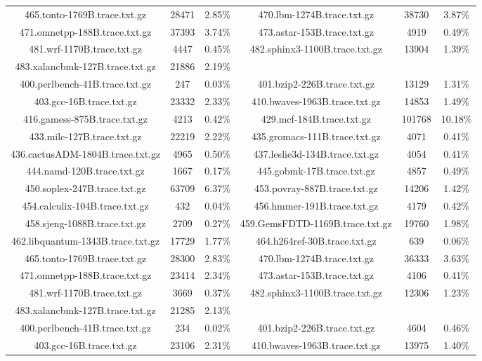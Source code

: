 \begin{table}[H]
\begin{tabular}{|c|c|c|c|c|c|}
465.tonto-1769B.trace.txt.gz & 28471 & 2.85\% & 470.lbm-1274B.trace.txt.gz & 38730 & 3.87\% \\
471.omnetpp-188B.trace.txt.gz & 37393 & 3.74\% & 473.astar-153B.trace.txt.gz & 4919 & 0.49\% \\
481.wrf-1170B.trace.txt.gz & 4447 & 0.45\% & 482.sphinx3-1100B.trace.txt.gz & 13904 & 1.39\% \\
483.xalancbmk-127B.trace.txt.gz & 21886 & 2.19\% & & & &  \\
400.perlbench-41B.trace.txt.gz & 247 & 0.03\% & 401.bzip2-226B.trace.txt.gz & 13129 & 1.31\% \\
403.gcc-16B.trace.txt.gz & 23332 & 2.33\% & 410.bwaves-1963B.trace.txt.gz & 14853 & 1.49\% \\
416.gamess-875B.trace.txt.gz & 4213 & 0.42\% & 429.mcf-184B.trace.txt.gz & 101768 & 10.18\% \\
433.milc-127B.trace.txt.gz & 22219 & 2.22\% & 435.gromacs-111B.trace.txt.gz & 4071 & 0.41\% \\
436.cactusADM-1804B.trace.txt.gz & 4965 & 0.50\% & 437.leslie3d-134B.trace.txt.gz & 4054 & 0.41\% \\
444.namd-120B.trace.txt.gz & 1667 & 0.17\% & 445.gobmk-17B.trace.txt.gz & 4857 & 0.49\% \\
450.soplex-247B.trace.txt.gz & 63709 & 6.37\% & 453.povray-887B.trace.txt.gz & 14206 & 1.42\% \\
454.calculix-104B.trace.txt.gz & 432 & 0.04\% & 456.hmmer-191B.trace.txt.gz & 4179 & 0.42\% \\
458.sjeng-1088B.trace.txt.gz & 2709 & 0.27\% & 459.GemsFDTD-1169B.trace.txt.gz & 19760 & 1.98\% \\
462.libquantum-1343B.trace.txt.gz & 17729 & 1.77\% & 464.h264ref-30B.trace.txt.gz & 639 & 0.06\% \\
465.tonto-1769B.trace.txt.gz & 28300 & 2.83\% & 470.lbm-1274B.trace.txt.gz & 36333 & 3.63\% \\
471.omnetpp-188B.trace.txt.gz & 23414 & 2.34\% & 473.astar-153B.trace.txt.gz & 4106 & 0.41\% \\
481.wrf-1170B.trace.txt.gz & 3669 & 0.37\% & 482.sphinx3-1100B.trace.txt.gz & 12306 & 1.23\% \\
483.xalancbmk-127B.trace.txt.gz & 21285 & 2.13\% & & & &  \\
400.perlbench-41B.trace.txt.gz & 234 & 0.02\% & 401.bzip2-226B.trace.txt.gz & 4604 & 0.46\% \\
403.gcc-16B.trace.txt.gz & 23106 & 2.31\% & 410.bwaves-1963B.trace.txt.gz & 13975 & 1.40\% \\

\end{tabular}
\end{table}
